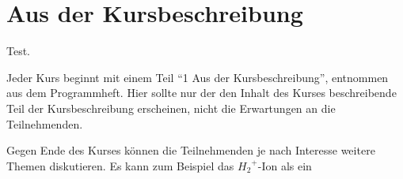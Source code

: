 \section{Aus der Kursbeschreibung}

Test.

Jeder Kurs beginnt mit einem Teil "`1 Aus der Kursbeschreibung"', entnommen aus dem Programmheft.
Hier sollte nur der den Inhalt des Kurses beschreibende
Teil der Kursbeschreibung erscheinen, nicht
die Erwartungen an die Teilnehmenden.




Gegen Ende des Kurses können die Teilnehmenden je nach Interesse weitere Themen diskutieren. Es kann zum Beispiel das ${H_2}^+$-Ion als ein